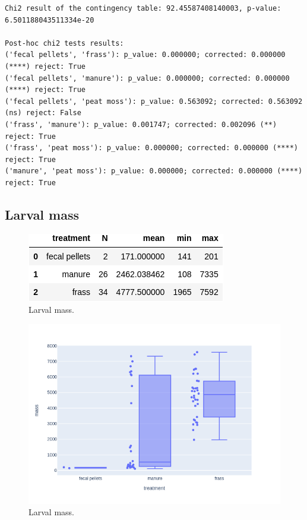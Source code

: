 \documentclass[12pt,letterpaper,english,bibliography=totocnumbered, abstract=on]{scrartcl}
\begin{document}
\begin{footnotesize}

\begin{verbatim}
Chi2 result of the contingency table: 92.45587408140003, p-value: 6.501188043511334e-20

Post-hoc chi2 tests results:
('fecal pellets', 'frass'): p_value: 0.000000; corrected: 0.000000 (****) reject: True
('fecal pellets', 'manure'): p_value: 0.000000; corrected: 0.000000 (****) reject: True
('fecal pellets', 'peat moss'): p_value: 0.563092; corrected: 0.563092 (ns) reject: False
('frass', 'manure'): p_value: 0.001747; corrected: 0.002096 (**) reject: True
('frass', 'peat moss'): p_value: 0.000000; corrected: 0.000000 (****) reject: True
('manure', 'peat moss'): p_value: 0.000000; corrected: 0.000000 (****) reject: True
\end{verbatim}

\end{footnotesize}

\subsection{Larval mass}

\begin{figure}[H]
	\centering
	\includegraphics[width=0.7\linewidth]{larval_mass_table}
	\caption{Larval mass.}
	\label{fig:larvalmasstable}
\end{figure}

\begin{figure}[H]
	\centering
	\includegraphics[width=0.7\linewidth]{larval_mass_plot}
	\caption{Larval mass.}
	\label{fig:larvalmassplot}
\end{figure}
\end{document}
